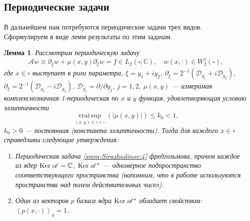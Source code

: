 \documentclass[a4paper,12pt]{article}
\newtheorem{lemma}[theorem]{Лемма}
\theoremstyle{definition}
\begin{document}
	\subsection{Периодические задачи}
	В дальнейшем нам потребуются периодические задачи трех видов. Сформулируем в виде   лемм  результаты по этим задачам.
	\begin{lemma}
		Рассмотрим периодическую задачу
		\begin{equation}\label{smm-Sirazhudinov:4}
			\mathscr{A}w\equiv\partial_{\bar{\xi}}w+\mu(x,y)\partial_\xi w=f\in L_2 (\square;\mathbb{C}),\quad w(x,\cdot)
			\in W_2^1 (\square),
		\end{equation}
		где $x\in \overline{\square}$ выступает в роли параметра, $\xi=y_1+iy_2$,
		$\partial_{\bar{\xi}}=2^{-1}(\mathscr{D}_{y_1}+i\mathscr{D}_{y_2})$,
		$\partial_\xi=2^{-1}(\mathscr{D}_{y_1}-i\mathscr{D}_{y_2})$,
		$\mathscr{D}_{y_j}=\partial/\partial y_j$, $j=1,2$,
		$\mu(x,y)$ --- измеримая комплекснозначная 1-периодическая по $x$ и $y$ функция, удовлетворяющая условию эллиптичности
		\begin{equation}\label{smm-Sirazhudinov:5}
			\mathop{\mathrm{vrai\, sup}}\limits_{(x,y)\in\overline\square\times\square} (|\mu(x,y)|)     \leqslant k_0<1,
		\end{equation}
		$k_0>0$ --- постоянная {\rm(}константа эллиптичности{\rm)}.
		Тогда для  каждого $x\in \overline\square$ справедливы следующие утверждения:
		\begin{enumerate}
			\item[1)]       Периодическая задача \eqref{smm-Sirazhudinov:4} фредгольмова, причем каждое из ядер $\text{\rm Ker\,}\mathscr{A}=\mathbb{C}$, $\text{\rm Ker\,}\mathscr{A}^\ast$ --- одномерное подпространство соответствующего пространства {\rm(}напомним,
			что в работе используются пространства над полем действительных чисел{\rm)}.
			\item[2)] Один из векторов $p$ базиса ядра $\text{\rm Ker\,}\mathscr{A}^\ast$ обладает свойством: $\left\langle p(x,\cdot)\right\rangle_y=1$.
		\end{enumerate}
	\end{lemma}
\end{document}
